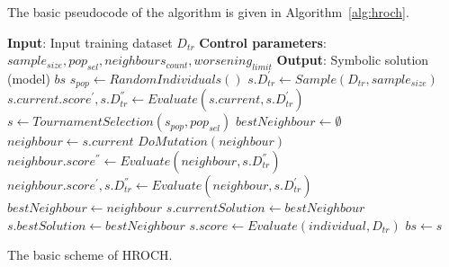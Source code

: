 \documentclass{bmcart}
\begin{document}
The basic pseudocode of the algorithm is given in Algorithm~\ref{alg:hroch}.

\begin{algorithm}
	\begin{algorithmic}[1]
		\Statex \textbf{Input}: Input training dataset $D_{tr}$
		\Statex \textbf{Control parameters}: $sample_{size}, pop_{sel}, neighbours_{count}, worsening_{limit}$ 
		\Statex \textbf{Output}: Symbolic solution (model) $bs$
		\State $s_{pop} \gets RandomIndividuals()$
			\State $s.D_{tr}^{'} \gets Sample(D_{tr}, sample_{size})$
			\State $s.current.score^{'}, s.D_{tr}^{''} \gets Evaluate(s.current, s.D_{tr}^{'})$
		\EndFor
			\State $s \gets TournamentSelection(s_{pop}, pop_{sel})$
			\State $bestNeighbour \gets \emptyset$
             
				\State $neighbour \gets s.current$
				\State $DoMutation(neighbour)$
				\State $neighbour.score^{''} \gets Evaluate(neighbour, s.D_{tr}^{''})$
					\State $neighbour.score^{'}, s.D_{tr}^{''} \gets Evaluate(neighbour, s.D_{tr}^{'})$
						\State $bestNeighbour \gets neighbour$
					\EndIf
				\EndIf
            \EndFor
				\State $s.currentSolution \gets bestNeighbour$
					\State $s.bestSolution \gets bestNeighbour$
				\EndIf
			\EndIf
        \EndWhile
		 
			\State $s.score \gets Evaluate(individual, D_{tr})$
				\State $bs \gets s$
			\EndIf
		\EndFor
		\State
	\end{algorithmic}
    \caption{The basic scheme of HROCH.}
	\label{alg:hroch} 
\end{algorithm}


 
 
 
\end{document}
